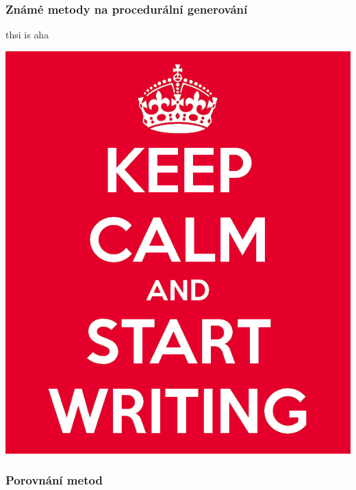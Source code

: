 \textcolor{gray}{\blindtext[4]}


\subsubsection{Známé metody na procedurální generování}
\label{metody}
thsi is \cite{Short} aha

\includegraphics[scale=0.3]{obrazky-figures/keep-calm.png}

\textcolor{gray}{\blindtext[10]}


\subsubsection{Porovnání metod}
\textcolor{gray}{\blindtext[8]}

